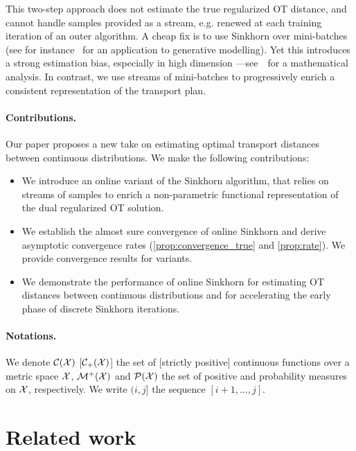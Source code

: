 This two-step approach does not estimate the true regularized OT
distance, and cannot handle samples provided as a stream, e.g. renewed at each
training iteration of an outer algorithm. A cheap fix is to use Sinkhorn over
mini-batches (see for instance~\citet{2018-Genevay-aistats} for an application
to generative modelling). Yet this introduces a strong estimation bias, especially in high
dimension ---see~\citet{fatras2019learning} for a mathematical analysis. In
contrast, we use streams of mini-batches to progressively enrich a consistent representation of the
transport plan.

\paragraph{Contributions.} Our paper proposes a new take on estimating optimal transport distances between continuous distributions. We make the following contributions:
\begin{itemize}[topsep=0pt, partopsep=0pt]
    \item We introduce an online variant of the Sinkhorn algorithm, that relies on
    streams of samples to enrich a non-parametric
    functional representation of the dual regularized OT solution.
    \item We establish the almost sure convergence of online Sinkhorn and derive asymptotic convergence rates 
    (\autoref{prop:convergence_true} and \ref{prop:rate}). We provide
    convergence results for variants.
    \item We demonstrate the performance of online Sinkhorn for estimating OT
    distances between continuous distributions and for accelerating the early
    phase of discrete Sinkhorn iterations.
\end{itemize}
% 
\paragraph{Notations.} We denote $\mathcal{C}(\mathcal{X})$ [$\mathcal{C}_+(\mathcal{X})$] the set of [strictly
positive] continuous functions over a metric space $\mathcal{X}$, $\mathcal{M}^+(\mathcal{X})$ and
$\mathcal{P}(\mathcal{X})$ the set of positive and probability measures on $\mathcal{X}$, respectively.
We write $(i, j]$ the sequence $[i+1, \dots,
j]$.


\section{Related work}\label{sec:related}

